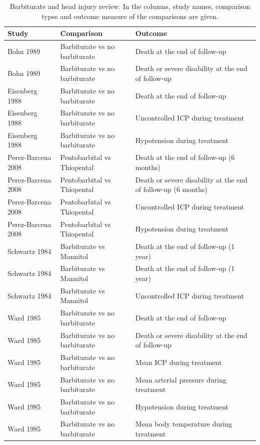 \documentclass[11pt,a4paper,twoside]{book}\usepackage[]{graphicx}\usepackage[]{color}
\begin{document}
\begin{table}[ht]
\centering
\begingroup\footnotesize
\begin{tabular}{lll}
  \hline
Study & Comparison & Outcome \\ 
  \hline
Bohn 1989 & Barbiturate vs no barbiturate & Death at the end of follow-up \\ 
  Bohn 1989 & Barbiturate vs no barbiturate & Death or severe disability at the end of follow-up \\ 
  Eisenberg 1988 & Barbiturate vs no barbiturate & Death at the end of follow-up \\ 
  Eisenberg 1988 & Barbiturate vs no barbiturate & Uncontrolled ICP during treatment \\ 
  Eisenberg 1988 & Barbiturate vs no barbiturate & Hypotension during treatment \\ 
  Perez-Barcena 2008 & Pentobarbital vs Thiopental & Death at the end of follow-up (6 months) \\ 
  Perez-Barcena 2008 & Pentobarbital vs Thiopental & Death or severe disability at the end of follow-up (6 months) \\ 
  Perez-Barcena 2008 & Pentobarbital vs Thiopental & Uncontrolled ICP during treatment \\ 
  Perez-Barcena 2008 & Pentobarbital vs Thiopental & Hypotension during treatment \\ 
  Schwartz 1984 & Barbiturate vs Mannitol & Death at the end of follow-up (1 year) \\ 
  Schwartz 1984 & Barbiturate vs Mannitol & Death at the end of follow-up (1 year) \\ 
  Schwartz 1984 & Barbiturate vs Mannitol & Uncontrolled ICP during treatment \\ 
  Ward 1985 & Barbiturate vs no barbiturate & Death at the end of follow-up \\ 
  Ward 1985 & Barbiturate vs no barbiturate & Death or severe disability at the end of follow-up \\ 
  Ward 1985 & Barbiturate vs no barbiturate & Mean ICP during treatment \\ 
  Ward 1985 & Barbiturate vs no barbiturate & Mean arterial pressure during treatment \\ 
  Ward 1985 & Barbiturate vs no barbiturate & Hypotension during treatment \\ 
  Ward 1985 & Barbiturate vs no barbiturate & Mean body temperature during treatment \\ 
   \hline
\end{tabular}
\endgroup
\caption{Barbiturate and head injury review. In the columns, study names, comparison types and outcome measure of the comparisons are given.} 
\label{barbiturates}
\end{table}
\end{document}
